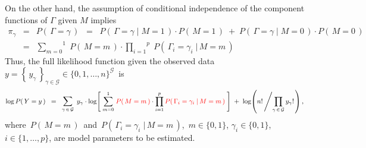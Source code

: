 \begin{remark}
\begin{equation*}
\end{equation*}
On the other hand, the assumption of conditional independence of the component functions of $\Gamma$ given $M$ implies
\begin{eqnarray*}
\pi_{\gamma}
& = & P\!\left(\,\Gamma = \gamma\,\right)
\;\; = \;\;
	P\!\left(\,\Gamma = \gamma\;\vert\;M=1\,\right)\cdot P\!\left(\,M=1\,\right)
	\; + \;
	P\!\left(\,\Gamma = \gamma\;\vert\;M=0\,\right)\cdot P\!\left(\,M=0\,\right)
\\
& = &
	\overset{1}{\underset{m=0}{\sum}}\;
	P\!\left(\,M=m\,\right) \cdot
	\overset{p}{\underset{i=1}{\prod}}\;P\!\left(\,\Gamma_{i} = \gamma_{i}\;\vert\,M=m\,\right)
\end{eqnarray*}
Thus, the full likelihood function given the observed data
\,$y = \left\{\,y_{\gamma}\,\right\}_{\gamma\in\mathcal{G}} \in \{0,1,\ldots,n\}^{\mathcal{G}}$\,
is
\begin{equation*}
\log P\!\left(\,Y = y\,\right)
\;\; = \;\;
\underset{\gamma\,\in\,\mathcal{G}}{\textnormal{\large$\sum$}}\;\, y_{\gamma}\cdot
	\log\!\left[\;
		\overset{1}{\underset{m=0}{\sum}}\;
		{\color{red}P\!\left(\,M=m\,\right)} \cdot
		\overset{p}{\underset{i=1}{\prod}}\,{\color{red}P\!\left(\,\Gamma_{i} = \gamma_{i}\;\vert\,M=m\,\right)}
	\;\right]
\; + \;
\log\!\left(n!\left/\overset{{\color{white}.}}{\underset{\gamma\,\in\,\mathcal{G}}{\prod}}\,y_{\gamma}!\right.\right),
\end{equation*}
where \,$P\!\left(\,M=m\,\right)$\, and \,$P\!\left(\,\Gamma_{i} = \gamma_{i}\;\vert\,M=m\,\right)$,\,
$m \in \{0,1\}$, $\gamma_{i} \in \{0,1\}$, $i\in\{1,\ldots,p\}$,
are model parameters to be estimated.
\end{remark}


